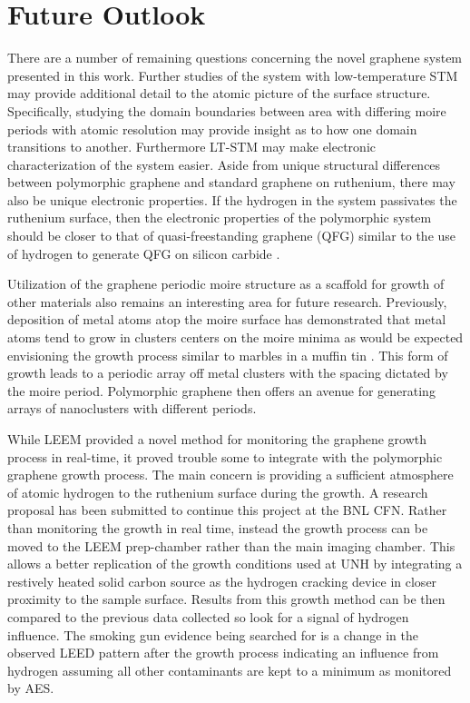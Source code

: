 \section{Future Outlook}
There are a number of remaining questions concerning the novel graphene system presented in this work. Further studies of the system with low-temperature STM may provide additional detail to the atomic picture of the surface structure. Specifically, studying the domain boundaries between area with differing moire periods with atomic resolution may provide insight as to how one domain transitions to another. Furthermore LT-STM may make electronic characterization of the system easier. Aside from unique structural differences between polymorphic graphene and standard graphene on ruthenium, there may also be unique electronic properties. If the hydrogen in the system passivates the ruthenium surface, then the electronic properties of the polymorphic system should be closer to that of quasi-freestanding graphene (QFG) similar to the use of hydrogen to generate QFG on silicon carbide \cite{SiC-passivation}.

Utilization of the graphene periodic moire structure as a scaffold for growth of other materials also remains an interesting area for future research. Previously, deposition of metal atoms atop the moire surface has demonstrated that metal atoms tend to grow in clusters centers on the moire minima as would be expected envisioning the growth process similar to marbles in a muffin tin \cite{ptclusters}. This form of growth leads to a periodic array off metal clusters with the spacing dictated by the moire period. Polymorphic graphene then offers an avenue for generating arrays of nanoclusters with different  periods.

While LEEM provided a novel method for monitoring the graphene growth process in real-time, it proved trouble some to integrate with the polymorphic graphene growth process. The main concern is providing a sufficient atmosphere of atomic hydrogen to the ruthenium surface during the growth. A research proposal has been submitted to continue this project at the BNL CFN. Rather than monitoring the growth in real time, instead the growth process can be moved to the LEEM prep-chamber rather than the main imaging chamber. This allows a better replication of the growth conditions used at UNH by integrating a restively heated solid carbon source as the hydrogen cracking device in closer proximity to the sample surface. Results from this growth method can be then compared to the previous data collected so look for a signal of hydrogen influence. The smoking gun evidence being searched for is a change in the observed LEED pattern after the growth process indicating an influence from hydrogen assuming all other contaminants are kept to a minimum as monitored by AES.

